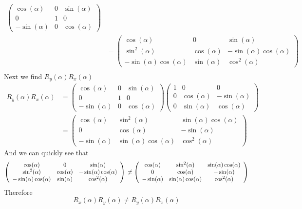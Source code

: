\documentclass[11pt]{article}
\numberwithin{equation}{section}
\begin{document}
\begin{enumerate}[(a)]
\begin{align*}
\left(\begin{array}{ccc}
      \cos(\alpha)    &0    &\sin(\alpha) \\
      0                &1    &0            \\
      -\sin(\alpha)    &0   &\cos(\alpha) 
      \end{array}\right)\\ 
&= \left(\begin{array}{ccc}
      \cos(\alpha)                &0               &\sin(\alpha) \\
      \sin^2(\alpha)             &\cos(\alpha)    &-\sin(\alpha)\cos(\alpha) \\
      -\sin(\alpha)\cos(\alpha)   &\sin(\alpha)    &\cos^2(\alpha) 
      \end{array}\right)\\ 
\end{align*}
Next we find $R_y(\alpha)R_x(\alpha)$
\begin{align*}
R_y(\alpha)R_x(\alpha) &= 
\left(\begin{array}{ccc}
      \cos(\alpha)    &0    &\sin(\alpha) \\
      0                &1    &0            \\
      -\sin(\alpha)    &0   &\cos(\alpha) 
      \end{array}\right)
\left(\begin{array}{ccc}
      1    &0               &0    \\
      0    &\cos(\alpha)    &-\sin(\alpha) \\
      0    &\sin(\alpha)    &\cos(\alpha) 
      \end{array}\right)\\ 
&= \left(\begin{array}{ccc}
      \cos(\alpha)    &\sin^2(\alpha)  &\sin(\alpha)\cos(\alpha) \\
      0               &\cos(\alpha)    &-\sin(\alpha)  \\
      -\sin(\alpha)    &\sin(\alpha)\cos(\alpha)   &\cos^2(\alpha) 
      \end{array}\right)
\end{align*}
And we can quickly see that
$$\left(\begin{array}{ccc}
      \cos(\alpha)                &0               &\sin(\alpha) \\
      \sin^2(\alpha)             &\cos(\alpha)    &-\sin(\alpha)\cos(\alpha) \\
      -\sin(\alpha)\cos(\alpha)   &\sin(\alpha)    &\cos^2(\alpha) 
      \end{array}\right)\\ 
\ne \left(\begin{array}{ccc}
      \cos(\alpha)    &\sin^2(\alpha)  &\sin(\alpha)\cos(\alpha) \\
      0               &\cos(\alpha)    &-\sin(\alpha)  \\
      -\sin(\alpha)    &\sin(\alpha)\cos(\alpha)   &\cos^2(\alpha) 
      \end{array}\right)$$
Therefore
$$R_x(\alpha)R_y(\alpha) \ne R_y(\alpha)R_x(\alpha)$$


\end{enumerate}
\end{document}
